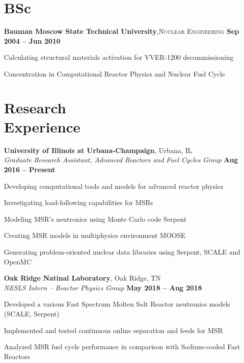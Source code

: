 \documentclass[margin,line]{resume}
\begin{document}
\begin{resume}
    \section{\mysidestyle BSc}
    \textbf{Bauman Moscow State Technical University},\textsc{Nuclear Engineering}\hfill \textbf{ Sep 2004 -- Jun 2010}\vspace{-3mm}\\\vspace{-1mm}%
    \begin{list2}
	\item Calculating structural materials activation for VVER-1200 decommissioning
	\item Concentration in Computational Reactor Physics and Nuclear Fuel Cycle
    \end{list2}\vspace{-1.5mm}
    \section{\mysidestyle Research\\Experience}               
    \textbf{University of Illinois at Urbana-Champaign}, Urbana, IL\\
		\textsl{Graduate Research Assistant, Advanced Reactors and Fuel Cycles Group} \hfill \textbf{Aug 2016 -- Present}\\
                \vspace{-4mm}\begin{list2}
                \item Developing computational tools and models for advanced 
                reactor physics
                \item Investigating load-following capabilities for MSRs
                \item Modeling MSR's neutronics using Monte Carlo code 
                Serpent
				\item Creating MSR models in multiphysics environment MOOSE
				\item Generating problem-oriented nuclear data libraries using 
				Serpent, SCALE and OpenMC
                \end{list2}

    \textbf{Oak Ridge Natinal Laboratory}, Oak Ridge, TN\\
		\textsl{NESLS Intern -- Reactor Physics Group} \hfill \textbf{May 2018 
		-- Aug 2018}\\
                \vspace{-4mm}\begin{list2}
                \item Developed a various Fast Spectrum Molten Salt Reactor 
                neutronics models (SCALE, Serpent)
				\item Implemented and tested continuous online separation and 
				feeds for MSR
				\item Analyzed MSR fuel cycle performance in comparison with 
				Sodium-cooled Fast Reactors
                \end{list2}


\end{resume}
\end{document}
